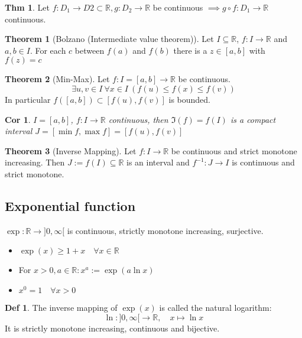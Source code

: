 \documentclass[a4paper, 10pt]{article}
\newtheorem*{corollary}{Cor}
\theoremstyle{definition}
\newtheorem*{theorem}{Thm}
\newtheorem*{definition}{Def}
\theoremstyle{named}
\newtheorem*{ntheorem_wrapper}{Theorem}
\newenvironment{ntheorem}%
    {\begin{mdframed}[style=important]\begin{ntheorem_wrapper}}%
    {\end{ntheorem_wrapper}\end{mdframed}}
\newcommand{\R}{\mathbb{R}}
\begin{document}
\begin{theorem}
    Let $f: D_1 \to D2 \subset \R, g: D_2 \to \R$ be continuous $\implies g \circ f : D_1 \to \R$ continuous.
\end{theorem}

\begin{ntheorem}[Bolzano (Intermediate value theorem)]
    Let $I \subseteq \R$, $f : I \to \R$ and $a, b \in I$. For each $c$ between $f(a)$ and $f(b)$ there is a $z \in [a, b]$ with $f(z) = c$
\end{ntheorem}

\begin{ntheorem}[Min-Max]
    Let $f: I = [a, b] \to \R$ be continuous.
    $$\exists u, v \in I \ \forall x \in I \ (f(u) \leq f(x) \leq f(v))$$
    In particular $f([a, b]) \subset [f(u), f(v)]$ is bounded.
\end{ntheorem}

\begin{corollary}
    $I = [a, b]$, $f: I \to \R$ continuous, then $\Im(f) = f(I)$ is a compact interval $J = [\min f, \max f] = [f(u), f(v)]$
\end{corollary}

\begin{ntheorem}[Inverse Mapping]
    Let $f: I \to \R$ be continuous and strict monotone increasing. Then $J := f(I) \subseteq \R$ is an interval and $f^{-1}: J \to I$ is continuous and strict monotone.
\end{ntheorem}

\subsection{Exponential function}
$\exp: \R \to ]0, \infty [$ is continuous, strictly monotone increasing, surjective.
\begin{itemize}
    \item $\exp(x) \geq 1 + x \quad \forall x \in \R$
    \item For $x > 0, a \in \R: x^a := \exp(a \ln x)$
    \item $x^0 = 1 \quad \forall x > 0$
\end{itemize}

\begin{definition}
    The inverse mapping of $\exp (x)$ is called the natural logarithm: 
    $$\ln : ]0, \infty [ \to \R, \quad x \mapsto \ln x$$
    It is strictly monotone increasing, continuous and bijective.
\end{definition}
\end{document}

